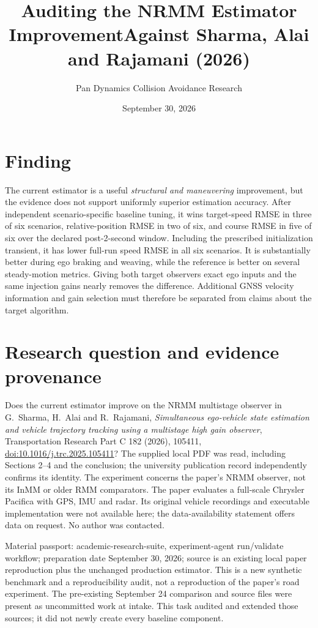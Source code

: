 \documentclass[11pt]{article}
\title{Auditing the NRMM Estimator Improvement\newline Against Sharma, Alai and Rajamani (2026)}
\author{Pan Dynamics Collision Avoidance Research}
\date{September 30, 2026}
\begin{document}
\maketitle

\section{Finding}
The current estimator is a useful \emph{structural and maneuvering} improvement,
but the evidence does not support uniformly superior estimation accuracy.
After independent scenario-specific baseline tuning, it wins target-speed
RMSE in three of six scenarios, relative-position RMSE in two of six, and
course RMSE in five of six over the declared post-2-second window. Including
the prescribed initialization transient, it has lower full-run speed RMSE in
all six scenarios. It is substantially better during ego braking and
weaving, while the reference is better on several steady-motion metrics.
Giving both target observers exact ego inputs and the same injection gains
nearly removes the difference. Additional GNSS velocity information and gain
selection must therefore be separated from claims about the target algorithm.


\section{Research question and evidence provenance}
Does the current estimator improve on the NRMM multistage observer in
G.~Sharma, H.~Alai and R.~Rajamani, \emph{Simultaneous ego-vehicle state
estimation and vehicle trajectory tracking using a multistage high gain
observer}, Transportation Research Part C 182 (2026), 105411,
\href{https://doi.org/10.1016/j.trc.2025.105411}{doi:10.1016/j.trc.2025.105411}?
The supplied local PDF was read, including Sections 2--4 and the conclusion;
the university publication record independently confirms its identity.
The experiment concerns the paper's NRMM observer, not its InMM or older RMM
comparators. The paper evaluates a full-scale Chrysler Pacifica with GPS,
IMU and radar. Its original vehicle recordings and executable implementation
were not available here; the data-availability statement offers data on
request. No author was contacted.

Material passport: academic-research-suite, experiment-agent run/validate
workflow; preparation date September 30, 2026; source is an existing local
paper reproduction plus the unchanged production estimator. This is a new
synthetic benchmark and a reproducibility audit, not a reproduction of the
paper's road experiment. The pre-existing September 24 comparison and source
files were present as uncommitted work at intake. This task audited and
extended those sources; it did not newly create every baseline component.
\end{document}

